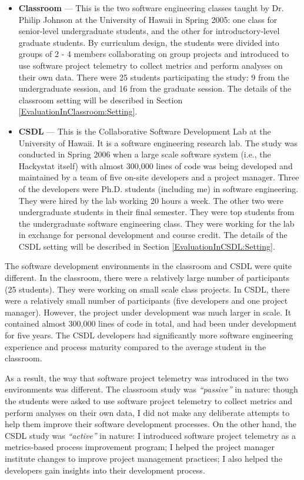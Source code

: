 \begin{itemize}
	\item \textbf{Classroom} --- This is the two software engineering classes taught by Dr. Philip Johnson at the University of Hawaii in Spring 2005: one class for senior-level undergraduate students, and the other for introductory-level graduate students. By curriculum design, the students were divided into groups of 2 - 4 members collaborating on group projects and introduced to use software project telemetry to collect metrics and perform analyses on their own data. There were 25 students participating the study: 9 from the undergraduate session, and 16 from the graduate session. The details of the classroom setting will be described in Section \ref{EvaluationInClassroom:Setting}.
	
	\item \textbf{CSDL} --- This is the Collaborative Software Development Lab at the University of Hawaii. It is a software engineering research lab. The study was conducted in Spring 2006 when a large scale software system (i.e., the Hackystat itself) with almost 300,000 lines of code was being developed and maintained by a team of five on-site developers and a project manager. Three of the developers were Ph.D. students (including me) in software engineering. They were hired by the lab working 20 hours a week. The other two were undergraduate students in their final semester. They were top students from the undergraduate software engineering class. They were working for the lab in exchange for personal development and course credit. The details of the CSDL setting will be described in Section \ref{EvaluationInCSDL:Setting}.

\end{itemize}

The software development environments in the classroom and CSDL were quite different. In the classroom, there were a relatively large number of participants (25 students). They were working on small scale class projects. In CSDL, there were a relatively small number of participants (five developers and one project manager). However, the project under development was much larger in scale. It contained almost 300,000 lines of code in total, and had been under development for five years. The CSDL developers had significantly more software engineering experience and process maturity compared to the average student in the classroom.

As a result, the way that software project telemetry was introduced in the two environments was different.
The classroom study was \textit{``passive''} in nature: though the students were asked to use software project telemetry to collect metrics and perform analyses on their own data, I did not make any deliberate attempts to help them improve their software development processes. On the other hand, the CSDL study was \textit{``active''} in nature: I introduced software project telemetry as a metrics-based process improvement program; I helped the project manager institute changes to improve project management practices; I also helped the developers gain insights into their development process.

